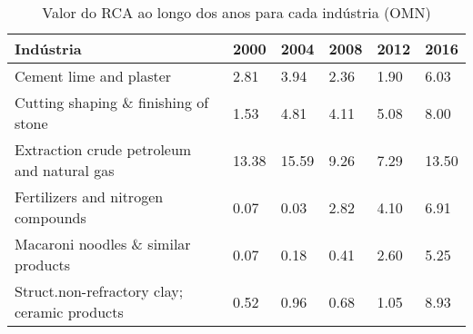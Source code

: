 \begin{table}
\centering
\caption{Valor do RCA ao longo dos anos para cada indústria (OMN)}
\begin{tabular}{p{6cm}p{1.5cm}p{1.5cm}p{1.5cm}p{1.5cm}p{1.5cm}}
\toprule
                                   Indústria &  2000 &  2004 & 2008 & 2012 &  2016 \\
\midrule
                     Cement lime and plaster &  2.81 &  3.94 & 2.36 & 1.90 &  6.03 \\
        Cutting shaping \& finishing of stone &  1.53 &  4.81 & 4.11 & 5.08 &  8.00 \\
  Extraction crude petroleum and natural gas & 13.38 & 15.59 & 9.26 & 7.29 & 13.50 \\
          Fertilizers and nitrogen compounds &  0.07 &  0.03 & 2.82 & 4.10 &  6.91 \\
         Macaroni noodles \& similar products &  0.07 &  0.18 & 0.41 & 2.60 &  5.25 \\
Struct.non-refractory clay; ceramic products &  0.52 &  0.96 & 0.68 & 1.05 &  8.93 \\
\bottomrule
\end{tabular}
\end{table}
